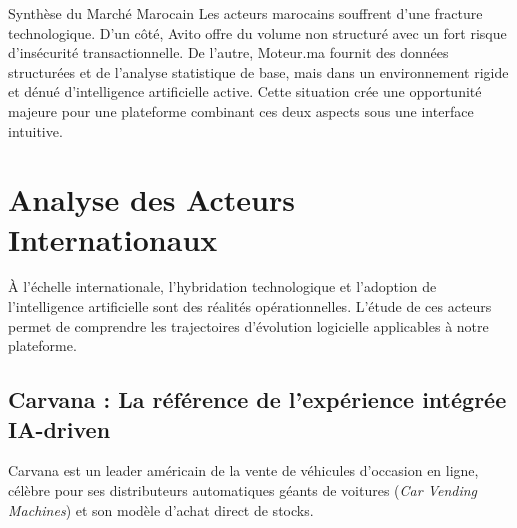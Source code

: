\documentclass[11pt,a4paper]{article}
\begin{document}
\begin{marketbox}{Synthèse du Marché Marocain}
Les acteurs marocains souffrent d'une fracture technologique. D'un côté, Avito offre du volume non structuré avec un fort risque d'insécurité transactionnelle. De l'autre, Moteur.ma fournit des données structurées et de l'analyse statistique de base, mais dans un environnement rigide et dénué d'intelligence artificielle active. Cette situation crée une opportunité majeure pour une plateforme combinant ces deux aspects sous une interface intuitive.
\end{marketbox}

\newpage

\section{Analyse des Acteurs Internationaux}

À l'échelle internationale, l'hybridation technologique et l'adoption de l'intelligence artificielle sont des réalités opérationnelles. L'étude de ces acteurs permet de comprendre les trajectoires d'évolution logicielle applicables à notre plateforme.

\subsection{Carvana : La référence de l'expérience intégrée IA-driven}
Carvana est un leader américain de la vente de véhicules d'occasion en ligne, célèbre pour ses distributeurs automatiques géants de voitures (\textit{Car Vending Machines}) et son modèle d'achat direct de stocks.
\end{document}
